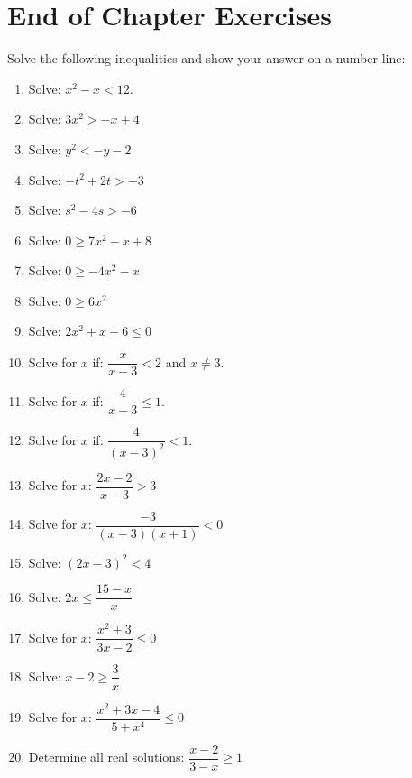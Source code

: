 \section{End of Chapter Exercises}
Solve the following inequalities and show your answer on a number line:
\begin{enumerate}
\item{Solve: $x^2-x<12$.}
\item{Solve: $3x^2 > -x + 4$}
\item{Solve: $y^2 < -y - 2$}
\item{Solve: $-t^2 + 2t > -3$}
\item{Solve: $s^2 - 4s > -6$}
\item{Solve: $0\geq7x^2-x+8$}
\item{Solve: $0\geq -4x^2-x$}
\item{Solve: $0\geq6x^2$}
\item{Solve: $2x^2 + x + 6\leq0$}
\item{Solve for $x$ if: $\dfrac{x}{x-3} < 2$ and $x \neq 3$.}
\item{Solve for $x$ if: $\dfrac{4}{x-3} \leq 1$.}
\item{Solve for $x$ if: $\dfrac{4}{(x-3)^2} < 1$.}
\item{Solve for $x$: $\dfrac{2x-2}{x-3} > 3$}
\item{Solve for $x$: $\dfrac{-3}{(x-3)(x+1)} <0$}
\item{Solve: $(2x-3)^2 < 4$}
\item{Solve: $2x \leq \dfrac{15-x}{x}$}
\item{Solve for $x$: \quad $\dfrac{x^2 + 3}{3x - 2} \leq 0$}
\item{Solve: $x-2 \geq \dfrac{3}{x}$}
\item{Solve for $x$: $\dfrac{x^2+3x-4}{5+x^4} \leq 0$}
\item{Determine all real solutions: $\dfrac{x-2}{3-x} \geq 1$}
\end{enumerate}








